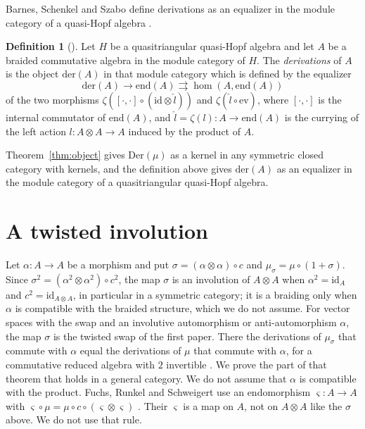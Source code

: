 \documentclass[]{interact}
\theoremstyle{plain}
\theoremstyle{definition}
\newtheorem{definition}[theorem]{Definition}
\theoremstyle{remark}
\newcommand{\Der}{\mathrm{Der}}
\newcommand{\id}{\mathrm{id}}
\begin{document}
Barnes, Schenkel and Szabo define derivations as an equalizer in the module category of a quasi-Hopf algebra \citep[Definition 3.4]{BarnesSchenkelSzabo2016}.

\begin{definition}[{\citep[Definition 3.4]{BarnesSchenkelSzabo2016}}]\label{def:bss}
Let $H$ be a quasitriangular quasi-Hopf algebra and let $A$ be a braided commutative algebra in the module category of $H$.
The \emph{derivations} of $A$ is the object $\mathrm{der}(A)$ in that module category which is defined by the equalizer
\[
\mathrm{der}(A) \longrightarrow \mathrm{end}(A) \rightrightarrows \hom(A, \mathrm{end}(A))
\]
of the two morphisms $\zeta([\cdot,\cdot] \circ (\mathrm{id} \otimes \hat l))$ and $\zeta(\hat l \circ \mathrm{ev})$, where $[\cdot,\cdot]$ is the internal commutator of $\mathrm{end}(A)$, and $\hat l = \zeta(l) \colon A \to \mathrm{end}(A)$ is the currying of the left action $l \colon A \otimes A \to A$ induced by the product of $A$.
\end{definition}

Theorem~\ref{thm:object} gives $\Der(\mu)$ as a kernel in any symmetric closed category with kernels, and the definition above gives $\mathrm{der}(A)$ as an equalizer in the module category of a quasitriangular quasi-Hopf algebra.

\section{A twisted involution}\label{sec:twisted}

Let $\alpha \colon A \to A$ be a morphism and put $\sigma = (\alpha \otimes \alpha) \circ c$ and $\mu_\sigma = \mu \circ (1 + \sigma)$.
Since $\sigma^2 = (\alpha^2 \otimes \alpha^2) \circ c^2$, the map $\sigma$ is an involution of $A \otimes A$ when $\alpha^2 = \id_A$ and $c^2 = \id_{A \otimes A}$, in particular in a symmetric category; it is a braiding only when $\alpha$ is compatible with the braided structure, which we do not assume.
For vector spaces with the swap and an involutive automorphism or anti-automorphism $\alpha$, the map $\sigma$ is the twisted swap of the first paper.
There the derivations of $\mu_\sigma$ that commute with $\alpha$ equal the derivations of $\mu$ that commute with $\alpha$, for a commutative reduced algebra with $2$ invertible \citep[Theorem 4.1]{Adrabi2026a}.
We prove the part of that theorem that holds in a general category.
We do not assume that $\alpha$ is compatible with the product.
Fuchs, Runkel and Schweigert use an endomorphism $\varsigma \colon A \to A$ with $\varsigma \circ \mu = \mu \circ c \circ (\varsigma \otimes \varsigma)$ \citep[Definition 2]{FuchsRunkelSchweigert2005}.
Their $\varsigma$ is a map on $A$, not on $A \otimes A$ like the $\sigma$ above.
We do not use that rule.
\end{document}
